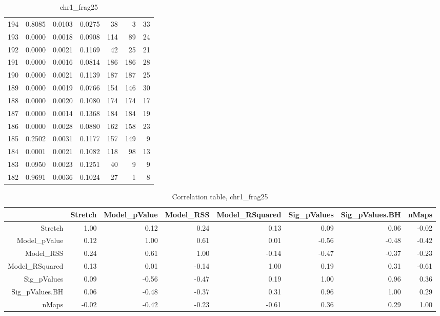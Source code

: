 \documentclass[11pt]{article}
\begin{document}
\begin{landscape}
\begin{table}[ht]
\begin{tabular}{rrrrrrr}
  194 & 0.8085 & 0.0103 & 0.0275 & 38 & 3 & 33 \\ 
  193 & 0.0000 & 0.0018 & 0.0908 & 114 & 89 & 24 \\ 
  192 & 0.0000 & 0.0021 & 0.1169 & 42 & 25 & 21 \\ 
  191 & 0.0000 & 0.0016 & 0.0814 & 186 & 186 & 28 \\ 
  190 & 0.0000 & 0.0021 & 0.1139 & 187 & 187 & 25 \\ 
  189 & 0.0000 & 0.0019 & 0.0766 & 154 & 146 & 30 \\ 
  188 & 0.0000 & 0.0020 & 0.1080 & 174 & 174 & 17 \\ 
  187 & 0.0000 & 0.0014 & 0.1368 & 184 & 184 & 19 \\ 
  186 & 0.0000 & 0.0028 & 0.0880 & 162 & 158 & 23 \\ 
  185 & 0.2502 & 0.0031 & 0.1177 & 157 & 149 & 9 \\ 
  184 & 0.0001 & 0.0021 & 0.1082 & 118 & 98 & 13 \\ 
  183 & 0.0950 & 0.0023 & 0.1251 & 40 & 9 & 9 \\ 
  182 & 0.9691 & 0.0036 & 0.1024 & 27 & 1 & 8 \\ 
   \hline
\end{tabular}
\caption{chr1\_frag25} 
\end{table}

\begin{table}[ht]
\centering
\begin{tabular}{rrrrrrrr}
  \hline
 & Stretch & Model\_pValue & Model\_RSS & Model\_RSquared & Sig\_pValues & Sig\_pValues.BH & nMaps \\ 
  \hline
Stretch & 1.00 & 0.12 & 0.24 & 0.13 & 0.09 & 0.06 & -0.02 \\ 
  Model\_pValue & 0.12 & 1.00 & 0.61 & 0.01 & -0.56 & -0.48 & -0.42 \\ 
  Model\_RSS & 0.24 & 0.61 & 1.00 & -0.14 & -0.47 & -0.37 & -0.23 \\ 
  Model\_RSquared & 0.13 & 0.01 & -0.14 & 1.00 & 0.19 & 0.31 & -0.61 \\ 
  Sig\_pValues & 0.09 & -0.56 & -0.47 & 0.19 & 1.00 & 0.96 & 0.36 \\ 
  Sig\_pValues.BH & 0.06 & -0.48 & -0.37 & 0.31 & 0.96 & 1.00 & 0.29 \\ 
  nMaps & -0.02 & -0.42 & -0.23 & -0.61 & 0.36 & 0.29 & 1.00 \\ 
   \hline
\end{tabular}
\caption{Correlation table, chr1\_frag25} 
\end{table}


\end{landscape}
\end{document}
